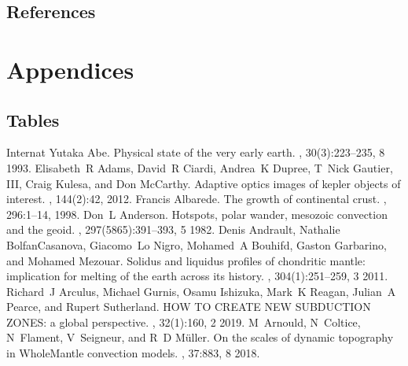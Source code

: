\documentclass[letterpaper,10pt,english]{jupyterBook}
\begin{document}
\chapter{References}
\label{\detokenize{references:references}}\label{\detokenize{references::doc}}
\sphinxAtStartPar



\part{Appendices}


\chapter{Tables}
\label{\detokenize{appendices/tables/main:tables}}\label{\detokenize{appendices/tables/main::doc}}
\begin{sphinxthebibliography}{Internat}
\sphinxAtStartPar
Yutaka Abe. Physical state of the very early earth. , 30(3):223–235, 8 1993.
\sphinxAtStartPar
Elisabeth R Adams, David R Ciardi, Andrea K Dupree, T Nick Gautier, III, Craig Kulesa, and Don McCarthy. Adaptive optics images of kepler objects of interest. , 144(2):42, 2012.
\sphinxAtStartPar
Francis Albarede. The growth of continental crust. , 296:1–14, 1998.
\sphinxAtStartPar
Don L Anderson. Hotspots, polar wander, mesozoic convection and the geoid. , 297(5865):391–393, 5 1982.
\sphinxAtStartPar
Denis Andrault, Nathalie Bolfan\sphinxhyphen{}Casanova, Giacomo Lo Nigro, Mohamed A Bouhifd, Gaston Garbarino, and Mohamed Mezouar. Solidus and liquidus profiles of chondritic mantle: implication for melting of the earth across its history. , 304(1):251–259, 3 2011.
\sphinxAtStartPar
Richard J Arculus, Michael Gurnis, Osamu Ishizuka, Mark K Reagan, Julian A Pearce, and Rupert Sutherland. HOW TO CREATE NEW SUBDUCTION ZONES: a global perspective. , 32(1):160, 2 2019.
\sphinxAtStartPar
M Arnould, N Coltice, N Flament, V Seigneur, and R D Müller. On the scales of dynamic topography in Whole\sphinxhyphen{}Mantle convection models. , 37:883, 8 2018.

\end{sphinxthebibliography}
\end{document}
